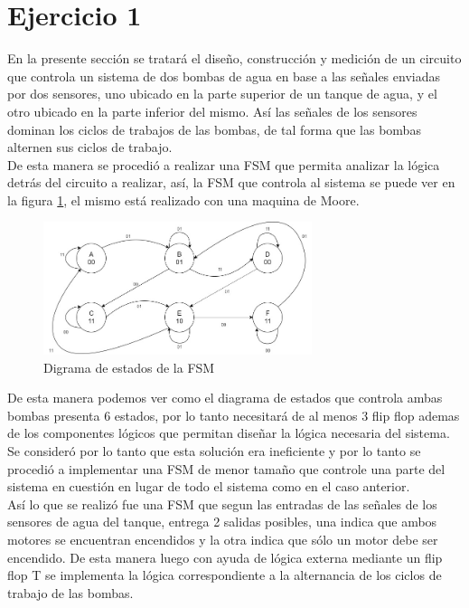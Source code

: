 \section{Ejercicio 1}
\noindent
En la presente sección se tratará el diseño, construcción y medición de un circuito que controla un sistema de dos bombas de agua en base a las señales enviadas por dos sensores, uno ubicado en la parte superior de un tanque de agua, y el otro ubicado en la parte inferior del mismo. Así las señales de los sensores dominan los ciclos de trabajos de las bombas, de tal forma que las bombas alternen sus ciclos de trabajo.\\
%
De esta manera se procedió a realizar una FSM que permita analizar la lógica detrás del circuito a realizar, así, la FSM que controla al sistema se puede ver en la figura \ref{ej1_fsm}, el mismo está realizado con una maquina de Moore.
%
\begin{figure}[H]
    \centering
    \includegraphics[width=0.7\textwidth]{figs/Ej1/diagrama_grande.jpg} %
    \caption{Digrama de estados de la FSM}
    \label{ej1_fsm}
\end{figure}
%
\noindent
De esta manera podemos ver como el diagrama de estados que controla ambas bombas presenta 6 estados, por lo tanto necesitará de al menos 3 flip flop ademas de los componentes lógicos que permitan diseñar la lógica necesaria del sistema. Se consideró por lo tanto que esta solución era ineficiente y por lo tanto se procedió a implementar una FSM de menor tamaño que controle una parte del sistema en cuestión en lugar de todo el sistema como en el caso anterior.\\
Así lo que se realizó fue una FSM que segun las entradas de las señales de los sensores de agua del tanque, entrega 2 salidas posibles, una indica que ambos motores se encuentran encendidos y la otra indica que sólo un motor debe ser encendido. De esta manera luego con ayuda de lógica externa mediante un flip flop T se implementa la lógica correspondiente a la alternancia de los ciclos de trabajo de las bombas.\\
